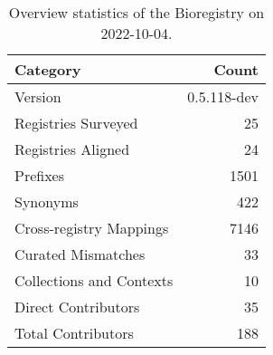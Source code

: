 \begin{table}
\centering
\caption{Overview statistics of the Bioregistry on 2022-10-04.}
\label{tab:bioregistry-summary}
\begin{tabular}{lr}
\toprule
                Category &       Count \\
\midrule
                 Version & 0.5.118-dev \\
     Registries Surveyed &          25 \\
      Registries Aligned &          24 \\
                Prefixes &        1501 \\
                Synonyms &         422 \\
 Cross-registry Mappings &        7146 \\
      Curated Mismatches &          33 \\
Collections and Contexts &          10 \\
     Direct Contributors &          35 \\
      Total Contributors &         188 \\
\bottomrule
\end{tabular}
\end{table}
